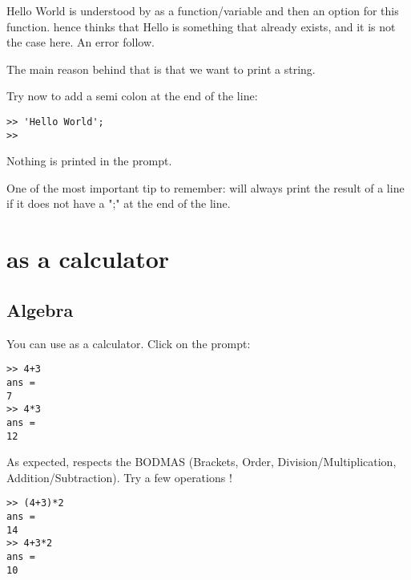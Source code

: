 Hello World is understood by \matlab as a function/variable and then an option for this function.
\matlab hence thinks that Hello is something that already exists, and it is not the case here. An error follow.

The main reason behind that is that we want to print a string.



Try now to add a semi colon at the end of the line:
\begin{lstlisting}
>> 'Hello World';
>>
\end{lstlisting}

Nothing is printed in the prompt.


One of the most important tip to remember: \matlab will always print the result of a line if it does not have a ";" at the end of the line.







\section{\matlab as a calculator}
\subsection{Algebra}

You can use \matlab as a calculator. 
Click on the prompt: 

\begin{lstlisting}
>> 4+3
ans =
7
>> 4*3
ans =
12
\end{lstlisting}

As expected, \matlab respects the BODMAS (Brackets, Order, Division/Multiplication, Addition/Subtraction). 
Try a few operations !
\begin{lstlisting}
>> (4+3)*2
ans =
14
>> 4+3*2
ans =
10
\end{lstlisting}

